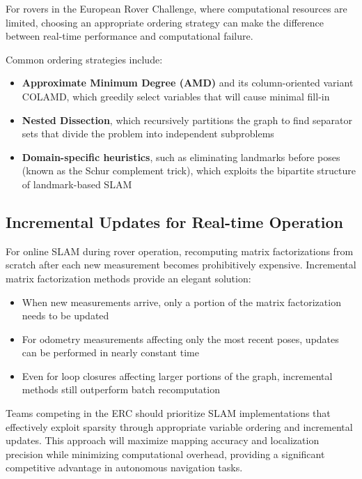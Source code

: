 \documentclass[journal]{IEEEtran}
\begin{document}
For rovers in the European Rover Challenge, where computational resources are limited, choosing an appropriate ordering strategy can make the difference between real-time performance and computational failure.

Common ordering strategies include:

\begin{itemize}
    \item \textbf{Approximate Minimum Degree (AMD)} and its column-oriented variant COLAMD, which greedily select variables that will cause minimal fill-in
    
    \item \textbf{Nested Dissection}, which recursively partitions the graph to find separator sets that divide the problem into independent subproblems
    
    \item \textbf{Domain-specific heuristics}, such as eliminating landmarks before poses (known as the Schur complement trick), which exploits the bipartite structure of landmark-based SLAM
\end{itemize}

\subsection{Incremental Updates for Real-time Operation}

For online SLAM during rover operation, recomputing matrix factorizations from scratch after each new measurement becomes prohibitively expensive. Incremental matrix factorization methods provide an elegant solution:

\begin{itemize}
    \item When new measurements arrive, only a portion of the matrix factorization needs to be updated
    
    \item For odometry measurements affecting only the most recent poses, updates can be performed in nearly constant time
    
    \item Even for loop closures affecting larger portions of the graph, incremental methods still outperform batch recomputation
\end{itemize}

Teams competing in the ERC should prioritize SLAM implementations that effectively exploit sparsity through appropriate variable ordering and incremental updates. This approach will maximize mapping accuracy and localization precision while minimizing computational overhead, providing a significant competitive advantage in autonomous navigation tasks.
\end{document}
